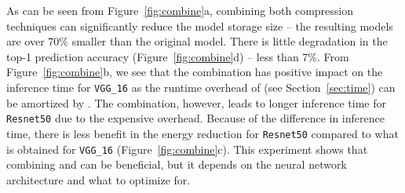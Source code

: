 As can be seen from Figure~\ref{fig:combine}a, combining both compression techniques can significantly reduce the model storage size -- the
resulting models are over 70\% smaller than the original model. There is little degradation in the top-1 prediction accuracy
(Figure~\ref{fig:combine}d) -- less than 7\%. From Figure~\ref{fig:combine}b, we see that the combination has positive impact on the
inference time for \texttt{VGG\_16} as the runtime overhead of \dquantization (see Section~\ref{sec:time}) can be amortized by \pruning.
The combination, however, leads to longer inference time for \texttt{Resnet50} due to the expensive \dquantization overhead. Because of the
difference in inference time, there is less benefit in the energy reduction for \texttt{Resnet50} compared to what is obtained for
\texttt{VGG\_16} (Figure~\ref{fig:combine}c). This experiment shows that combining \pruning and \quantization can be beneficial, but it
depends on the neural network architecture and what to optimize for.
